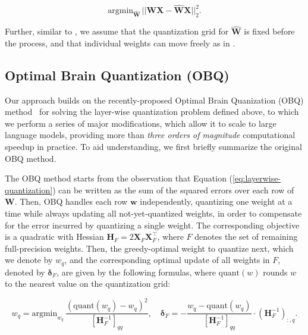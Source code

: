 \begin{equation}
    \label{eq:layerwise-quantization}
    \text{argmin}_{\mathbf{\widehat{W}}} \, ||\mathbf{W} \mathbf{X} - \mathbf{\widehat{W}} \mathbf{X}||_2^2.
\end{equation}

Further, similar to \cite{nagel2020up, li2021brecq, frantar2022obc}, we assume that the quantization grid for $\mathbf{\widehat{W}}$ is fixed before the process, and that individual weights can move freely as in \cite{hubara2021accurate, frantar2022obc}.

\subsection{Optimal Brain Quantization (OBQ)}

Our approach builds on the recently-proposed Optimal Brain Quanization (OBQ) method~\cite{frantar2022obc} for solving the layer-wise quantization problem defined above, to which we perform a series of major modifications, which allow it to scale to large language models, providing more than \emph{three orders of magnitude} computational speedup in practice. To aid understanding, we first briefly summarize the original OBQ method.

The OBQ method starts from the observation that Equation (\ref{eq:layerwise-quantization}) can be written as the sum of the squared errors over each row of $\mathbf{W}$. 
Then, OBQ handles each row $\mathbf{w}$ independently, quantizing one weight at a time while always updating all not-yet-quantized weights, in order to compensate for the error incurred by quantizing a single weight. The corresponding objective is a quadratic with Hessian $\mathbf{H}_F = 2\mathbf{X}_F\mathbf{X}_F^\top$, where $F$ denotes the set of remaining full-precision weights. Then, the greedy-optimal weight to quantize next, which we denote by $w_q$, and the corresponding optimal update of all weights in $F$, denoted by $\boldsymbol{\delta}_F$, are given by the following formulas, where $\text{quant}(w)$ rounds $w$ to the nearest value on the quantization grid:

\begin{equation}
    \label{eq:obs-quant}
    w_q = \text{argmin}_{w_q} \, \frac{(\text{quant}(w_q) - w_q)^2}{[\mathbf{H}_F^{-1}]_{qq}}, \quad \boldsymbol{\delta}_F = - \frac{w_q - \text{quant}(w_q)}{[\mathbf{H}_F^{-1}]_{qq}} \cdot (\mathbf{H}_F^{-1})_{:, q}.
\end{equation}

